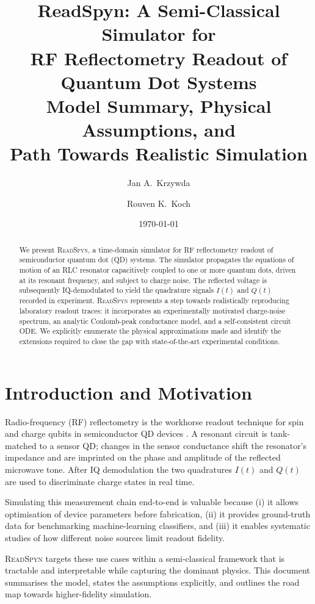 \documentclass[11pt,a4paper]{article}
\title{\textbf{ReadSpyn}: A Semi-Classical Simulator for\\
  RF Reflectometry Readout of Quantum Dot Systems\\[4pt]
  \large Model Summary, Physical Assumptions, and\\
  Path Towards Realistic Simulation}
\author{Jan A.\ Krzywda \and Rouven K.\ Koch}
\date{\today}
\begin{document}
\maketitle

\begin{abstract}
We present \textsc{ReadSpyn}, a time-domain simulator for RF reflectometry
readout of semiconductor quantum dot (QD) systems.
The simulator propagates the equations of motion of an RLC resonator
capacitively coupled to one or more quantum dots, driven at its resonant
frequency, and subject to charge noise.
The reflected voltage is subsequently IQ-demodulated to yield the quadrature
signals $I(t)$ and $Q(t)$ recorded in experiment.
\textsc{ReadSpyn} represents a step towards realistically reproducing
laboratory readout traces: it incorporates an experimentally motivated
charge-noise spectrum, an analytic Coulomb-peak conductance model, and a
self-consistent circuit ODE.
We explicitly enumerate the physical approximations made and identify the
extensions required to close the gap with state-of-the-art experimental
conditions.
\end{abstract}

\tableofcontents
\newpage

\section{Introduction and Motivation}

Radio-frequency (RF) reflectometry is the workhorse readout technique for
spin and charge qubits in semiconductor QD devices
\cite{Schoelkopf1998,Ares2016,Gonzalez-Zalba2015}.
A resonant circuit is tank-matched to a sensor QD; changes in the sensor
conductance shift the resonator's impedance and are imprinted on the phase
and amplitude of the reflected microwave tone.
After IQ demodulation the two quadratures $I(t)$ and $Q(t)$ are used to
discriminate charge states in real time.

Simulating this measurement chain end-to-end is valuable because
(i) it allows optimisation of device parameters before fabrication,
(ii) it provides ground-truth data for benchmarking machine-learning
classifiers, and
(iii) it enables systematic studies of how different noise sources limit
readout fidelity.

\textsc{ReadSpyn} targets these use cases within a semi-classical framework
that is tractable and interpretable while capturing the dominant physics.
This document summarises the model, states the assumptions explicitly, and
outlines the road map towards higher-fidelity simulation.
\end{document}
